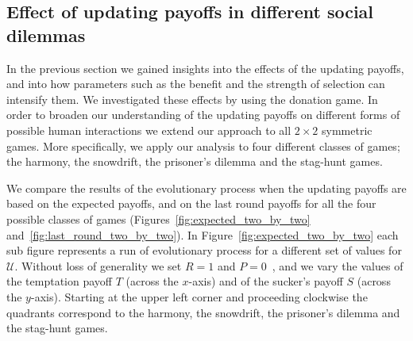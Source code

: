 \documentclass[11pt]{article}
\theoremstyle{plainCl1}
\theoremstyle{plainCl2}
\begin{document}
\subsection{Effect of updating payoffs in different social dilemmas}\label{section:2_by_2_games}

In the previous section we gained insights into the effects of the updating
payoffs, and into how parameters such as the benefit and the strength of
selection can intensify them. We investigated these effects by using the
donation game. In order to broaden our understanding of the updating payoffs on
different forms of possible human interactions we extend our approach to all
\(2 \times 2\) symmetric games. More specifically, we apply our analysis to four
different classes of games; the harmony, the snowdrift, the prisoner's dilemma
and the stag-hunt games.

We compare the results of the evolutionary process when the updating payoffs are based on the expected
payoffs, and on the last round payoffs for all the four possible classes of
games (Figures~\ref{fig:expected_two_by_two}
and~\ref{fig:last_round_two_by_two}). In Figure~\ref{fig:expected_two_by_two}
each sub figure represents a run of evolutionary process for a different set of
values for \(\mathcal{U}\). Without loss of generality we set \(R=1\) and
\(P=0\)~\cite{Martinez2012, Roca2009}, and we vary the values of the temptation
payoff \(T\) (across the \(x\)-axis) and of the sucker's payoff \(S\) (across
the \(y\)-axis). Starting at the upper left corner and proceeding clockwise the
quadrants correspond to the harmony, the snowdrift, the prisoner's dilemma and
the stag-hunt games.
\end{document}
